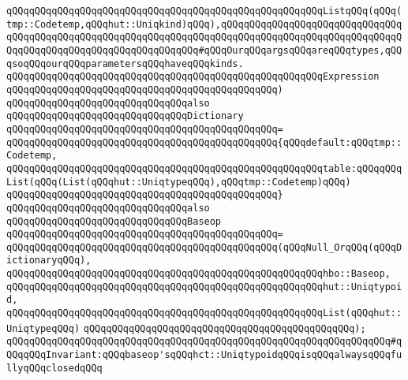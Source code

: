 \verb|qQQqqQQqqQQqqQQqqQQqqQQqqQQqqQQqqQQqqQQqqQQqqQQqqQQqqQQqListqQQq(qQQq(tmp::Codetemp,qQQqhut::Uniqkind)qQQq),qQQqqQQqqQQqqQQqqQQqqQQqqQQqqQQqqQQqqQQqqQQqqQQqqQQqqQQqqQQqqQQqqQQqqQQqqQQqqQQqqQQqqQQqqQQqqQQqqQQqqQQqqQQqqQQqqQQqqQQqqQQqqQQqqQQqqQQq#qQQqOurqQQqargsqQQqareqQQqtypes,qQQqsoqQQqourqQQqparametersqQQqhaveqQQqkinds.|\newline
\verb|qQQqqQQqqQQqqQQqqQQqqQQqqQQqqQQqqQQqqQQqqQQqqQQqqQQqqQQqExpression|\newline
\verb|qQQqqQQqqQQqqQQqqQQqqQQqqQQqqQQqqQQqqQQqqQQqqQQq)|\newline
\newline
\verb|qQQqqQQqqQQqqQQqqQQqqQQqqQQqqQQqalso|\newline
\verb|qQQqqQQqqQQqqQQqqQQqqQQqqQQqqQQqDictionary|\newline
\verb|qQQqqQQqqQQqqQQqqQQqqQQqqQQqqQQqqQQqqQQqqQQqqQQq=|\newline
\verb|qQQqqQQqqQQqqQQqqQQqqQQqqQQqqQQqqQQqqQQqqQQqqQQq{qQQqdefault:qQQqtmp::Codetemp,|\newline
\verb|qQQqqQQqqQQqqQQqqQQqqQQqqQQqqQQqqQQqqQQqqQQqqQQqqQQqqQQqtable:qQQqqQQqList(qQQq(List(qQQqhut::UniqtypeqQQq),qQQqtmp::Codetemp)qQQq)|\newline
\verb|qQQqqQQqqQQqqQQqqQQqqQQqqQQqqQQqqQQqqQQqqQQqqQQq}|\newline
\newline
\verb|qQQqqQQqqQQqqQQqqQQqqQQqqQQqqQQqalso|\newline
\verb|qQQqqQQqqQQqqQQqqQQqqQQqqQQqqQQqBaseop|\newline
\verb|qQQqqQQqqQQqqQQqqQQqqQQqqQQqqQQqqQQqqQQqqQQqqQQq=|\newline
\verb|qQQqqQQqqQQqqQQqqQQqqQQqqQQqqQQqqQQqqQQqqQQqqQQq(qQQqNull_OrqQQq(qQQqDictionaryqQQq),|\newline
\verb|qQQqqQQqqQQqqQQqqQQqqQQqqQQqqQQqqQQqqQQqqQQqqQQqqQQqqQQqhbo::Baseop,|\newline
\verb|qQQqqQQqqQQqqQQqqQQqqQQqqQQqqQQqqQQqqQQqqQQqqQQqqQQqqQQqhut::Uniqtypoid,|\newline
\verb|qQQqqQQqqQQqqQQqqQQqqQQqqQQqqQQqqQQqqQQqqQQqqQQqqQQqqQQqList(qQQqhut::UniqtypeqQQq)|\newline
\verb|qQQqqQQqqQQqqQQqqQQqqQQqqQQqqQQqqQQqqQQqqQQqqQQq);|\newline
\verb|qQQqqQQqqQQqqQQqqQQqqQQqqQQqqQQqqQQqqQQqqQQqqQQqqQQqqQQqqQQqqQQqqQQq#qQQqqQQqInvariant:qQQqbaseop'sqQQqhct::UniqtypoidqQQqisqQQqalwaysqQQqfullyqQQqclosedqQQq|\newline
\newline
